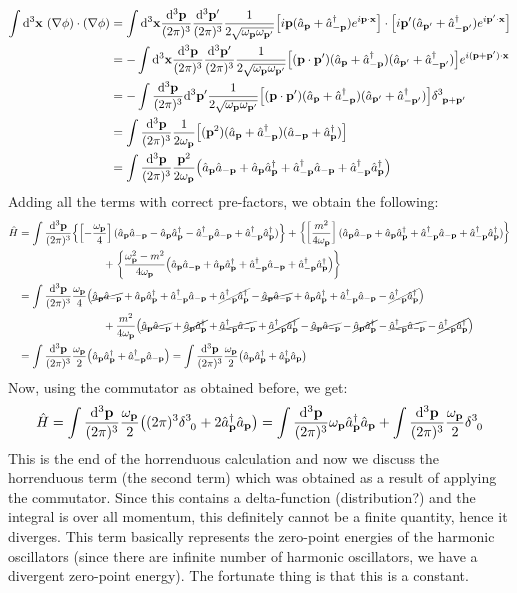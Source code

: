 \begin{align*}
    \int \dd^3\vb{x}\ (\nabla \phi)\cdot (\nabla\phi) &= \int \dd^3\vb{x}  \meas{\vb{\vb{p}}}\meas{\vb{\vb{p'}}} \frac{1}{2\sqrt{\omp\ompd}}\qty[i\vb{p} (\annp+\cremp)e^{i \vb{p}\cdot \vb{x}}]\cdot \qty[i\vb{p}' (\annpd+\crempd)e^{i \vb{p}'\cdot \vb{x}}]\\
    &= -\int \dd^3\vb{x}  \meas{\vb{\vb{p}}}\meas{\vb{\vb{p'}}} \frac{1}{2\sqrt{\omp\ompd}}\qty[(\vb{p}\cdot \vb{p}') (\annp+\cremp)(\annpd+\crempd)] e^{i (\vb{p}+\vb{p}')\cdot \vb{x}}\\
    &=-\int  \meas{\vb{\vb{p}}}\dd^3\vb{p}' \frac{1}{2\sqrt{\omp\ompd}}\qty[(\vb{p}\cdot \vb{p}') (\annp+\cremp)(\annpd+\crempd)] \delt{3}{\vb{p}+\vb{p}'}\\
    &=\int  \meas{\vb{\vb{p}}} \frac{1}{2\omp}\qty[(\vb{p}^2) (\annp+\cremp)(\annmp+\crep)] \\
    &=\int  \meas{\vb{\vb{p}}} \frac{\vb{p}^2}{2\omp}\qty(\annp\annmp+\annp\crep+\cremp\annmp+\cremp\crep)
\end{align*}
Adding all the terms with correct pre-factors, we obtain the following:
\begin{align*}
    \hat{H} &= \int  \frac{\dd^3\vb{{\vb{\vb{p}}}}}{(2\pi)^3}\qty{\qty[-\frac{\omega_{\vb{{p}}}}{4}] (\hat{a}_{\vb{p}}\hat{a}_{\vb{-p}}-\hat{a}_{\vb{p}}\hat{a}_{\vb{p}}^\dagger-\hat{a}_{\vb{-p}}^\dagger\hat{a}_{\vb{-p}}+\hat{a}_{\vb{-p}}^\dagger\hat{a}_{\vb{p}}^\dagger)}+\qty{\qty[\frac{m^2}{4\omega_{\vb{{p}}}}] (\hat{a}_{\vb{p}}\hat{a}_{\vb{-p}}+\hat{a}_{\vb{p}}\hat{a}_{\vb{p}}^\dagger+\hat{a}_{\vb{-p}}^\dagger\hat{a}_{\vb{-p}}+\hat{a}_{\vb{-p}}^\dagger\hat{a}_{\vb{p}}^\dagger)}\\
    & \qquad\qquad\qquad\qquad +\qty{\frac{\omega_{\vb{{p}}}^2-m^2}{4\omega_{\vb{{p}}}}\qty(\hat{a}_{\vb{p}}\hat{a}_{\vb{-p}}+\hat{a}_{\vb{p}}\hat{a}_{\vb{p}}^\dagger+\hat{a}_{\vb{-p}}^\dagger\hat{a}_{\vb{-p}}+\hat{a}_{\vb{-p}}^\dagger\hat{a}_{\vb{p}}^\dagger)}\\
    &=\int  \frac{\dd^3\vb{{\vb{\vb{p}}}}}{(2\pi)^3} \frac{\omega_{\vb{{p}}}}{4}\qty(\cancel{\hat{a}_{\vb{p}}\hat{a}_{\vb{-p}}}+\hat{a}_{\vb{p}}\hat{a}_{\vb{p}}^\dagger+\hat{a}_{\vb{-p}}^\dagger\hat{a}_{\vb{-p}}+\cancel{\hat{a}_{\vb{-p}}^\dagger\hat{a}_{\vb{p}}^\dagger} -\cancel{\hat{a}_{\vb{p}}\hat{a}_{\vb{-p}}} +\hat{a}_{\vb{p}}\hat{a}_{\vb{p}}^\dagger+\hat{a}_{\vb{-p}}^\dagger\hat{a}_{\vb{-p}}-\cancel{\hat{a}_{\vb{-p}}^\dagger\hat{a}_{\vb{p}}^\dagger})\\
    &\qquad\qquad\qquad\qquad + \frac{m^2}{4\omega_{\vb{{p}}}}\qty(\cancel{\hat{a}_{\vb{p}}\hat{a}_{\vb{-p}}} +\cancel{\hat{a}_{\vb{p}}\hat{a}_{\vb{p}}^\dagger}+\cancel{\hat{a}_{\vb{-p}}^\dagger\hat{a}_{\vb{-p}}}+\cancel{\hat{a}_{\vb{-p}}^\dagger\hat{a}_{\vb{p}}^\dagger} - \cancel{\hat{a}_{\vb{p}}\hat{a}_{\vb{-p}}}-\cancel{\hat{a}_{\vb{p}}\hat{a}_{\vb{p}}^\dagger}-\cancel{\hat{a}_{\vb{-p}}^\dagger\hat{a}_{\vb{-p}}}-\cancel{\hat{a}_{\vb{-p}}^\dagger\hat{a}_{\vb{p}}^\dagger}) \\
    &=\int  \frac{\dd^3\vb{{\vb{\vb{p}}}}}{(2\pi)^3} \frac{\omega_{\vb{{p}}}}{2}\qty(\hat{a}_{\vb{p}}\hat{a}_{\vb{p}}^\dagger+\hat{a}_{\vb{-p}}^\dagger\hat{a}_{\vb{-p}}) = \int  \frac{\dd^3\vb{{\vb{\vb{p}}}}}{(2\pi)^3} \frac{\omega_{\vb{{p}}}}{2}\qty(\hat{a}_{\vb{p}}\hat{a}_{\vb{p}}^\dagger+\hat{a}_{\vb{p}}^\dagger\hat{a}_{\vb{p}})
\end{align*}
Now, using the commutator as obtained before, we get:
$$\hat{H} = \int  \meas{\vb{\vb{p}}} \frac{\omp}{2}\qty((2\pi)^3\delt{3}{0}+2\crep\annp) = \int  \meas{\vb{\vb{p}}} \omp \crep\annp +\int \meas{\vb{\vb{p}}} \frac{\omp}{2}\delt{3}{0}$$
This is the end of the horrenduous calculation and now we discuss the horrenduous term (the second term) which was obtained as a result of applying the commutator. Since this contains a delta-function (distribution?) and the integral is over all momentum, this definitely cannot be a finite quantity, hence it diverges. This term basically represents the zero-point energies of the harmonic oscillators (since there are infinite number of harmonic oscillators, we have a divergent zero-point energy). The fortunate thing is that this is a constant. \\[0.2cm]
